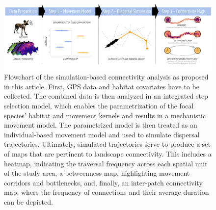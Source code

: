 \documentclass[abstract=on,10pt,a4paper,bibliography=totocnumbered]{article}
\begin{document}
\begin{figure}[htbp]
  \begin{center}
    \includegraphics[width = \textwidth]{99_GraphicalAbstract2.pdf}
    \caption{Flowchart of the simulation-based connectivity analysis as proposed
    in this article. First, GPS data and habitat covariates have to be
    collected. The combined data is then analyzed in an integrated step
    selection model, which enables the parametrization of the focal species'
    habitat and movement kernels and results in a mechanistic movement model.
    The parametrized model is then treated as an individual-based movement model
    and used to simulate dispersal trajectories. Ultimately, simulated
    trajectories serve to produce a set of maps that are pertinent to landscape
    connectivity. This includes a heatmap, indicating the traversal frequency
    across each spatial unit of the study area, a betweenness map, highlighting
    movement corridors and bottlenecks, and, finally, an inter-patch
    connectivity map, where the frequency of connections and their average
    duration can be depicted.}
    \label{GraphicalAbstract}
  \end{center}
\end{figure}

\end{document}
